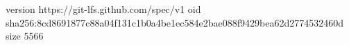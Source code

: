 version https://git-lfs.github.com/spec/v1
oid sha256:8cd8691877c88a04f131c1b0a4be1ec584e2bae088f9429bea62d2774532460d
size 5566
